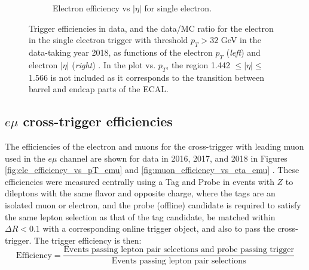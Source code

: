 \begin{figure}[h]
\begin{subfigure}{0.45\textwidth}
        \caption{Electron efficiency vs $|\eta|$ for single electron.}
        \label{fig:single_ele_32GeV_efficiency_vs_eta}
    \end{subfigure}
    \caption[Trigger efficiencies in data and the data/MC ratio for the electron in the single electron trigger with threshold $p_{T} > 32$ GeV in the data-taking year 2018, as functions of the electron $p_{T}$ (\textit{left}) and electron $|\eta|$ (\textit{right}).]{Trigger efficiencies in data, and the data/MC ratio for the electron in the single electron trigger with threshold $p_{T} > 32$ GeV in the data-taking year 2018, as functions of the electron $p_{T}$ (\textit{left}) and electron $|\eta|$ (\textit{right}) \cite{CMS-DP-2020-016}. In the plot vs. $p_{T}$, the region 1.442 $\leq |\eta| \leq$ 1.566 is not included as it corresponds to the transition between barrel and endcap parts of the ECAL.} 
\end{figure}


\subsection{\texorpdfstring{$e\mu$}{emu} cross-trigger efficiencies}

The efficiencies of the electron and muons for the cross-trigger with leading muon used in the $e\mu$ channel are shown for data in 2016, 2017, and 2018 in Figures \ref{fig:ele_efficiency_vs_pT_emu} and \ref{fig:muon_efficiency_vs_eta_emu} \cite{CMS-DP-2019-025}. These efficiencies were measured centrally using a Tag and Probe in events with $Z$ to dileptons with the same flavor and opposite charge, where the tags are an isolated muon or electron, and the probe (offline) candidate is required to satisfy the same lepton selection as that of the tag candidate, be matched within $\Delta R < 0.1$ with a corresponding online trigger object, and also to pass the cross-trigger. The trigger efficiency is then:
\begin{equation}
    \text{Efficiency} = \frac{\text{Events passing lepton pair selections and probe passing trigger}}{\text{Events passing lepton pair selections}}
\end{equation}

